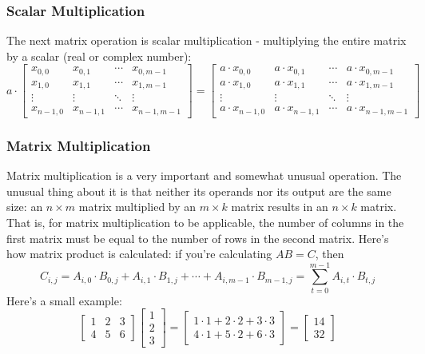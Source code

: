 \documentclass{article}
\begin{document}
\subsubsection{Scalar Multiplication}
The next matrix operation is scalar multiplication - multiplying the entire matrix by a scalar (real or complex number):
\begin{equation*}
    a \cdot
\begin{bmatrix}
    x_{0,0} & x_{0,1} & \dotsb & x_{0,m-1} \\
    x_{1,0} & x_{1,1} & \dotsb & x_{1,m-1} \\
    \vdots  & \vdots  & \ddots & \vdots  \\
    x_{n-1,0} & x_{n-1,1} & \dotsb & x_{n-1,m-1}
\end{bmatrix} =
\begin{bmatrix}
    a \cdot x_{0,0} & a \cdot x_{0,1} & \dotsb & a \cdot x_{0,m-1} \\
    a \cdot x_{1,0} & a \cdot x_{1,1} & \dotsb & a \cdot x_{1,m-1} \\
    \vdots  & \vdots  & \ddots & \vdots  \\
    a \cdot x_{n-1,0} & a \cdot x_{n-1,1} & \dotsb & a \cdot x_{n-1,m-1}
\end{bmatrix}
\end{equation*}
\subsubsection{Matrix Multiplication}
Matrix multiplication is a very important and somewhat unusual operation. The unusual thing about it is that neither its operands nor its output are the same size: an $n \times m$ matrix multiplied by an $m \times k$ matrix results in an $n \times k$ matrix. That is, for matrix multiplication to be applicable, the number of columns in the first matrix must be equal to the number of rows in the second matrix.
Here's how matrix product is calculated: if you're calculating $AB = C$, then
\begin{equation*}
    C_{i,j} = A_{i,0} \cdot B_{0,j} + A_{i,1} \cdot B_{1,j} + \dotsb + A_{i,m-1} \cdot B_{m-1,j} = \sum_{t = 0}^{m-1} A_{i,t} \cdot B_{t,j}
\end{equation*}
Here's a small example:
\begin{equation*}
\begin{bmatrix}
    1 & 2 & 3 \\
    4 & 5 & 6
\end{bmatrix}
\begin{bmatrix}
    1 \\
    2 \\
    3
\end{bmatrix} =
\begin{bmatrix}
    1 \cdot 1 + 2 \cdot 2 + 3 \cdot 3 \\
    4 \cdot 1 + 5 \cdot 2 + 6 \cdot 3
\end{bmatrix} =
\begin{bmatrix}
    14 \\
    32
\end{bmatrix}
\end{equation*}
\end{document}
